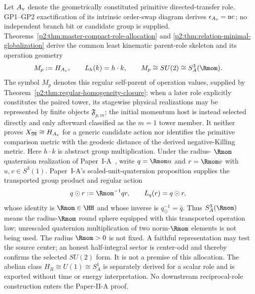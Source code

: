\documentclass[12pt,a4paper]{article}
\begin{document}
\begin{definition}
\label{p2:def:momentum-branch-specialization}
Let \(A_{\rm v}\) denote the geometrically constituted primitive
directed-transfer role.  GP1--GP2 exactification of its intrinsic order-swap
diagram derives
\(\epsilon_{A_{\rm v}}=\mathrm{nc}\); no independent branch bit or candidate
group is supplied.  Theorems~\ref{p2:thm:master-compact-role-allocation} and
\ref{p2:thm:relation-minimal-globalization} derive the common least kinematic
parent-role skeleton and its operation geometry
\[
        M_p:=H_{A_{\rm v}},\qquad
        L_h(k)=h\cdot k,\qquad
        M_p\cong SU(2)\cong S^3_A(\Rmom).
\]
The symbol \(M_p\) denotes this regular self-parent of operation
values, supplied by
Theorem~\ref{p2:thm:regular-homogeneity-closure}; when a later role explicitly constitutes the paired tower, its stagewise
physical realizations may be represented by finite objects
\(\mathfrak F_{p,m}\); the initial momentum host is instead selected directly
and only afterward classified as the \(m=1\) tower member.  It neither proves
\(X_{\mathfrak M}\cong H_{A_{\rm v}}\) for a generic candidate action nor
identifies the primitive comparison metric with the geodesic distance of
the derived negative-Killing metric.
Here \(h\cdot k\) is abstract group multiplication.  Under the radius-
\(\Rmom\) quaternion realization of
Paper~I-A~\cite{Kugelmann2026a}, write \(q=\Rmom u\) and \(r=\Rmom v\) with
\(u,v\in S^3(1)\).  Paper~I-A's scaled-unit-quaternion proposition supplies
the transported group product and regular action
\[
        q\odot r:=\Rmom^{-1}qr,
        \qquad
        L_q(r)=q\odot r,
\]
whose identity is \(\Rmom\in\HH\) and whose inverse is
\(q^{-1}_{\odot}=\bar q\).  Thus \(S^3_A(\Rmom)\) means the
radius-\(\Rmom\) round sphere equipped with this transported operation law;
unrescaled quaternion multiplication of two norm-\(\Rmom\) elements is not
being used.
The radius \(\Rmom>0\) is not fixed.  A faithful representation may test the
source center; an honest half-integral sector is center-odd and thereby
confirms the selected \(SU(2)\) form.  It is not a premise of this
allocation.  The abelian class \(H_R\cong U(1)\cong S^1_A\) is separately
derived for a scalar role and is exported without time or energy
interpretation.  No downstream reciprocal-role construction enters the
Paper-II-A proof.
\end{definition}
\end{document}
